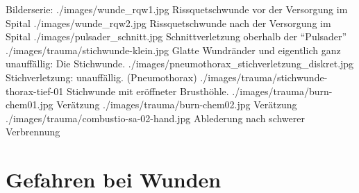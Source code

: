 \begin{PictureSeriesWide}{}{Bilderserie: }
{./images/wunde_rqw1.jpg}
{Rissquetschwunde
vor der Versorgung im Spital
}
{./images/wunde_rqw2.jpg}
{Rissquetschwunde
nach der Versorgung im Spital
}
{./images/pulsader_schnitt.jpg}
{Schnittverletzung
oberhalb der \enquote{Pulsader}
}
{}
{}
{./images/trauma/stichwunde-klein.jpg}
{Glatte
Wundränder und eigentlich ganz unauffällig: Die Stichwunde.
}
{./images/pneumothorax_stichverletzung_diskret.jpg}
{Stichverletzung:
unauffällig. 
(Pneumothorax)}
{./images/trauma/stichwunde-thorax-tief-01}
{Stichwunde
mit eröffneter Brusthöhle.
}
{}
{}
{./images/trauma/burn-chem01.jpg}
{Verätzung
}
{./images/trauma/burn-chem02.jpg}
{Verätzung
}
{./images/trauma/combustio-sa-02-hand.jpg}
{Ablederung nach schwerer
Verbrennung
}
{}
{}
\end{PictureSeriesWide}



\section{Gefahren bei Wunden}

